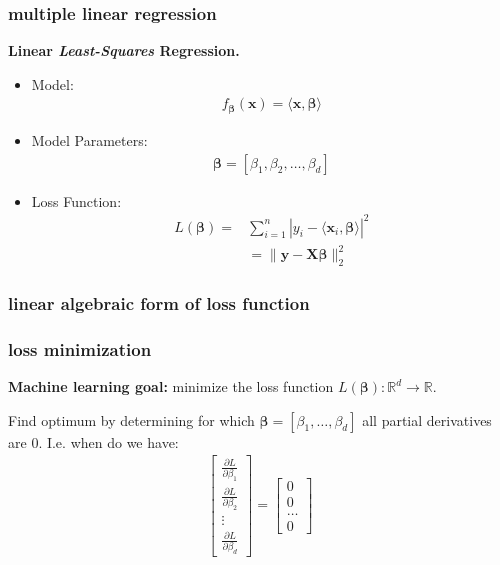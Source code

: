 \documentclass[handout,compress]{beamer}
\newcommand{\bs}[1]{\boldsymbol{#1}}
\newcommand{\bv}[1]{\mathbf{#1}}
\newcommand{\R}{\mathbb{R}}
\begin{document}
\begin{frame}
	\frametitle{multiple linear regression}
	\begin{center}
		\textbf{Linear \emph{Least-Squares} Regression.}
	\end{center}
	\begin{itemize}
		\item Model: 
		\begin{align*}
		f_{\bs{\beta}}(\bv{x}) = \langle\bv{x},\bs{\beta}\rangle
		\end{align*}
		\item Model Parameters: 
		\begin{align*}
		\bs{\beta} = \left[\beta_1, \beta_2, \ldots, \beta_d \right]
		\end{align*}
		\item Loss Function:
		\begin{align*}
		L(\bs{\beta}) = &\sum_{i=1}^n |y_i - \langle\bv{x}_i,\bs{\beta}\rangle|^2 \\
		& = \|\bv{y} -\bv{X}\bv{\beta}\|_2^2
		\end{align*}
	\end{itemize}
\end{frame}

\begin{frame}
	\frametitle{linear algebraic form of loss function}
	
	
\end{frame}

\begin{frame}
	\frametitle{loss minimization}
	\textbf{Machine learning goal:} minimize the loss function $L(\bs{\beta}): \R^{d} \rightarrow \R$.
	
	\vspace{1em}
	Find optimum by determining for which $\bs{\beta} = [\beta_1, \ldots, \beta_d]$ all partial derivatives are $0$. I.e. when do we have:
		\begin{align*}
		\begin{bmatrix}
		\frac{\partial L}{\partial \beta_1} \\ \frac{\partial L}{\partial \beta_2} \\ \vdots \\ \frac{\partial L}{\partial \beta_d}
		\end{bmatrix} = 
		\begin{bmatrix}
		0 \\ 0 \\ \ldots \\ 0
		\end{bmatrix} 
		\end{align*}
\end{frame}
\end{document}
